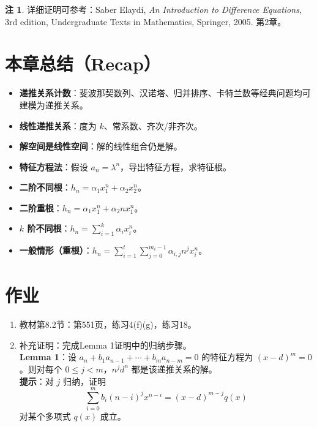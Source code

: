 \documentclass[UTF8,11pt,a4paper]{ctexbook}   %
\theoremstyle{definition}
\newtheorem{remark}{注}[section]
\begin{document}
\begin{remark}
详细证明可参考：Saber Elaydi, \textit{An Introduction to Difference Equations}, 3rd edition, Undergraduate Texts in Mathematics, Springer, 2005. 第2章。
\end{remark}

\section*{本章总结（Recap）}

\begin{itemize}
    \item \textbf{递推关系计数}：斐波那契数列、汉诺塔、归并排序、卡特兰数等经典问题均可建模为递推关系。
    \item \textbf{线性递推关系}：度为 $k$、常系数、齐次/非齐次。
    \item \textbf{解空间是线性空间}：解的线性组合仍是解。
    \item \textbf{特征方程法}：假设 $a_n = \lambda^n$，导出特征方程，求特征根。
    \item \textbf{二阶不同根}：$h_n = \alpha_1 x_1^n + \alpha_2 x_2^n$。
    \item \textbf{二阶重根}：$h_n = \alpha_1 x_1^n + \alpha_2 n x_1^n$。
    \item \textbf{$k$ 阶不同根}：$h_n = \sum_{i=1}^k \alpha_i x_i^n$。
    \item \textbf{一般情形（重根）}：$h_n = \sum_{i=1}^{t}\sum_{j=0}^{m_i-1} \alpha_{i,j} n^j x_i^n$。
\end{itemize}

\section*{作业}

\begin{enumerate}
    \item 教材第8.2节：第551页，练习4(f)(g)，练习18。
    \item 补充证明：完成Lemma 1证明中的归纳步骤。\\
    \textbf{Lemma 1}：设 $a_n + b_1 a_{n-1} + \cdots + b_m a_{n-m} = 0$ 的特征方程为 $(x-d)^m = 0$。则对每个 $0 \le j < m$，$n^j d^n$ 都是该递推关系的解。\\
    \textbf{提示}：对 $j$ 归纳，证明
    \[
    \sum_{i=0}^m b_i (n-i)^j x^{n-i} = (x-d)^{m-j} q(x)
    \]
    对某个多项式 $q(x)$ 成立。
\end{enumerate}
\end{document}
